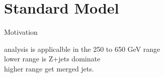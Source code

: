 \section[Standard Model]{Standard Model}

\begin{frame}{Motivation}
\begin{center}
analysis is applicalble in the 250 to 650 GeV range
\\
lower range is Z+jets dominate\\
higher range get merged jets.

\end{center}
\end{frame}










